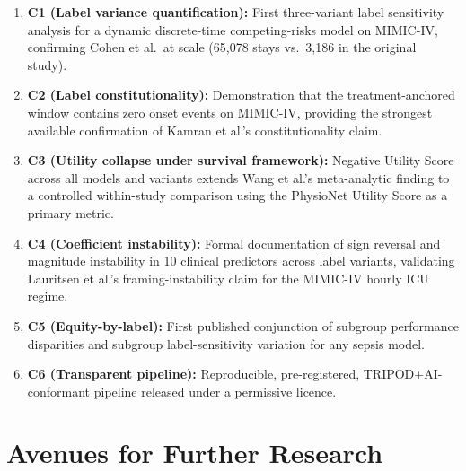 \begin{enumerate}
  \item \textbf{C1 (Label variance quantification):} First three-variant
  label sensitivity analysis for a dynamic discrete-time competing-risks model
  on MIMIC-IV, confirming Cohen et al.\ at scale (65{,}078 stays vs.\ 3{,}186
  in the original study).
  \item \textbf{C2 (Label constitutionality):} Demonstration that the
  treatment-anchored window contains zero onset events on MIMIC-IV, providing
  the strongest available confirmation of Kamran et al.'s
  \parencite{kamran2024evaluation} constitutionality claim.
  \item \textbf{C3 (Utility collapse under survival framework):} Negative
  Utility Score across all models and variants extends Wang et al.'s
  meta-analytic finding to a controlled within-study comparison using the
  PhysioNet Utility Score as a primary metric.
  \item \textbf{C4 (Coefficient instability):} Formal documentation of sign
  reversal and magnitude instability in 10 clinical predictors across label
  variants, validating Lauritsen et al.'s \parencite{lauritsen2021framing}
  framing-instability claim for the MIMIC-IV hourly ICU regime.
  \item \textbf{C5 (Equity-by-label):} First published conjunction of subgroup
  performance disparities and subgroup label-sensitivity variation for any
  sepsis model.
  \item \textbf{C6 (Transparent pipeline):} Reproducible, pre-registered,
  TRIPOD+AI-conformant pipeline released under a permissive licence.
\end{enumerate}

\section{Avenues for Further Research}

